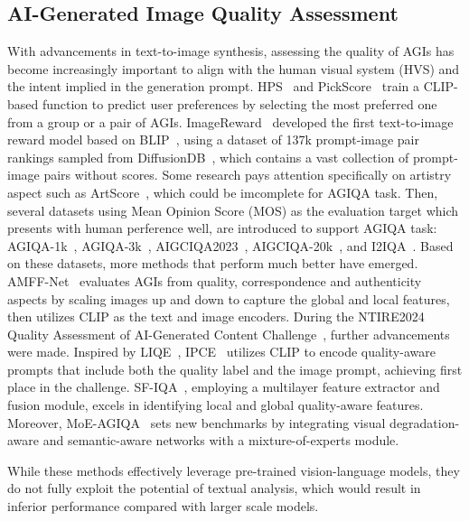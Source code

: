 \subsection{AI-Generated Image Quality Assessment}
With advancements in text-to-image synthesis, assessing the quality of AGIs has become increasingly important to align with the human visual system (HVS) and the intent implied in the generation prompt.
HPS~\cite{wu2023better} and PickScore~\cite{kirstain2023pick} train a CLIP-based function to predict user preferences by selecting the most preferred one from a group or a pair of AGIs.
ImageReward~\cite{xu2024imagereward} developed the first text-to-image reward model based on BLIP~\cite{li2022blip}, using a dataset of 137k prompt-image pair rankings sampled from DiffusionDB~\cite{wang2022diffusiondb}, which contains a vast collection of prompt-image pairs without scores. 
Some research pays attention specifically on artistry aspect such as ArtScore~\cite{chen2024learning}, which could be imcomplete for AGIQA task.
Then, several datasets using Mean Opinion Score (MOS) as the evaluation target which presents with human perference well, are introduced to support AGIQA task: AGIQA-1k~\cite{zhang2023perceptual}, AGIQA-3k~\cite{li2023agiqa}, AIGCIQA2023~\cite{wang2023aigciqa2023}, AIGCIQA-20k~\cite{li2024aigiqa}, and I2IQA~\cite{yuan2023pku}. 
Based on these datasets, more methods that perform much better have emerged.
AMFF-Net~\cite{zhou2024adaptive} evaluates AGIs from quality, correspondence and authenticity aspects by scaling images up and down to capture the global and local features, then utilizes CLIP as the text and image encoders.
During the NTIRE2024 Quality Assessment of AI-Generated Content Challenge~\cite{liu2024ntire}, further advancements were made.
Inspired by LIQE~\cite{zhang2023blind}, IPCE~\cite{peng2024aigc} utilizes CLIP to encode quality-aware prompts that include both the quality label and the image prompt, achieving first place in the challenge.
SF-IQA~\cite{yu2024sf}, employing a multilayer feature extractor and fusion module, excels in identifying local and global quality-aware features.
Moreover, MoE-AGIQA~\cite{yang2024moe} sets new benchmarks by integrating visual degradation-aware and semantic-aware networks with a mixture-of-experts module.

While these methods effectively leverage pre-trained vision-language models, they do not fully exploit the potential of textual analysis, which would result in inferior performance compared with larger scale models.

